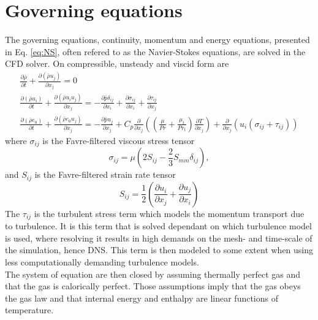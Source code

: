 \section{Governing equations}
The governing equations, continuity, momentum and energy equations, presented in Eq. \ref{eq:NS}, often refered to as the Navier-Stokes equations, are solved in the CFD solver. On compressible, unsteady and viscid form are
\begin{equation} 
  \label{eq:NS}
  \begin{gathered}
    \frac{\partial \bar{\rho}}{\partial t} + \frac{\partial \left(\bar{\rho} {u}_j \right)}{\partial x_j} = 0 \\
    \frac{\partial \left( \bar{\rho} {u}_i \right)}{\partial t} + \frac{\partial\left(\bar{\rho} {u}_i {u}_j \right)}{\partial x_j} = -\frac{\partial \bar{p}\delta _{ij}}{\partial x_i} + \frac{\partial {\sigma} _{ij}}{\partial x_i}+\frac{\partial \tau _{ij}}{\partial x_j} \\
    \frac{\partial \left( \bar{\rho} {e}_0\right)}{\partial t} + \frac{\partial \left(\bar{\rho} {e}_0 {u}_j\right)}{\partial x_j}= -\frac{\partial \bar{p}{u}_j}{\partial x_j}+C_p\frac{\partial}{\partial x_j}\left(\left(\frac{\mu}{Pr}+\frac{\mu _t}{Pr_t}\right)\frac{\partial {T}}{\partial x_j}\right)+\frac{\partial}{\partial x_j}\left({u}_i\left({\sigma} _{ij}+\tau _{ij}\right)\right)
  \end{gathered}
\end{equation}
where ${\sigma} _{ij}$ is the Favre-filtered viscous stress tensor
\begin{equation}
  {\sigma} _{ij} = \mu \left(2{S}_{ij}-\frac{2}{3}{S}_{mm}\delta _{ij}\right),
\end{equation}
and ${S}_{ij}$ is the Favre-filtered strain rate tensor
\begin{equation}
  {S}_{ij}=\frac{1}{2}\left(\frac{\partial {u}_i}{\partial x_j}+\frac{\partial {u}_j}{\partial x_i}\right)
\end{equation}
The $\tau _{ij}$ is the turbulent stress term which models the momentum transport due to turbulence. It is this term that is solved dependant on which turbulence model is used, where resolving it results in high demands on the mesh- and time-scale of the simulation, hence DNS. This term is then modeled to some extent when using less computationally demanding turbulence models.\\
The system of equation are then closed by assuming thermally perfect gas and that the gas is calorically perfect. Those assumptions imply that the gas obeys the gas law and that internal energy and enthalpy are linear functions of temperature.


